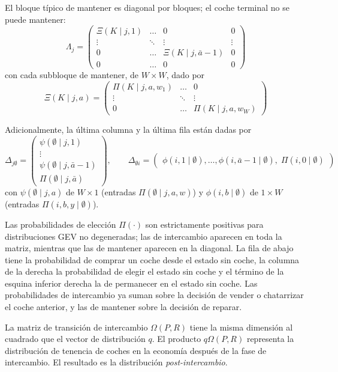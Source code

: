 \documentclass{article}
\begin{document}
El bloque típico de mantener es diagonal por bloques; el coche terminal no se puede mantener:
$$
\Lambda_j=
\begin{pmatrix}
    \Xi(K\mid j, 1) & \dots & 0 & 0\\
    \vdots & \ddots & \vdots & \vdots\\
    0 & \dots & \Xi(K\mid j, \bar{a}-1) & 0\\
    0 & \dots & 0 & 0
\end{pmatrix}
$$
con cada subbloque de mantener, de $W\times W$, dado por
$$
\Xi(K\mid j, a) =
\begin{pmatrix}
    \Pi(K \mid j, a, w_1) & \dots & 0\\
    \vdots & \ddots & \vdots \\
    0 & \dots & \Pi(K \mid j, a, w_W)
\end{pmatrix}
$$

Adicionalmente, la última columna y la última fila están dadas por
$$
\Delta_{j \emptyset}=\begin{pmatrix}
    \psi(\emptyset \mid j, 1)\\
    \vdots \\
    \psi(\emptyset \mid j, \bar{a}-1)\\
    \Pi(\emptyset \mid j, \bar{a})
\end{pmatrix},
\qquad
\Delta_{\emptyset i}=\begin{pmatrix}
    \phi(i, 1 \mid \emptyset), \dots, \phi(i, \bar{a}-1 \mid \emptyset),\; \Pi(i, 0 \mid \emptyset)
\end{pmatrix}
$$
con $\psi(\emptyset\mid j,a)$ de $W\times1$ (entradas $\Pi(\emptyset\mid j,a,w)$) y $\phi(i,b\mid\emptyset)$ de $1\times W$ (entradas $\Pi(i,b,y\mid\emptyset)$).

Las probabilidades de elección $\Pi(\cdot)$ son estrictamente positivas para distribuciones GEV no degeneradas; las de intercambio aparecen en toda la matriz, mientras que las de mantener aparecen en la diagonal. La fila de abajo tiene la probabilidad de comprar un coche desde el estado sin coche, la columna de la derecha la probabilidad de elegir el estado sin coche y el término de la esquina inferior derecha la de permanecer en el estado sin coche. Las probabilidades de intercambio ya suman sobre la decisión de vender o chatarrizar el coche anterior, y las de mantener sobre la decisión de reparar.

La matriz de transición de intercambio $\Omega(P,R)$ tiene la misma dimensión al cuadrado que el vector de distribución $q$. El producto $q\Omega(P,R)$ representa la distribución de tenencia de coches en la economía después de la fase de intercambio. El resultado es la distribución \textit{post-intercambio}.
\end{document}
